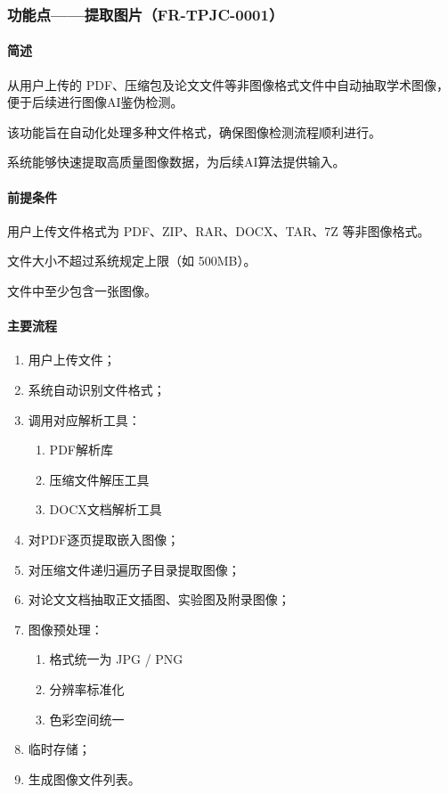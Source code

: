 {\color{black}
\subsubsection{功能点——提取图片（FR-TPJC-0001）}

\paragraph*{简述}

从用户上传的 PDF、压缩包及论文文件等非图像格式文件中自动抽取学术图像，便于后续进行图像AI鉴伪检测。

该功能旨在自动化处理多种文件格式，确保图像检测流程顺利进行。

系统能够快速提取高质量图像数据，为后续AI算法提供输入。

\paragraph*{前提条件}

用户上传文件格式为 PDF、ZIP、RAR、DOCX、TAR、7Z 等非图像格式。

文件大小不超过系统规定上限（如 500MB）。

文件中至少包含一张图像。

\paragraph*{主要流程}

\begin{enumerate}
    \item 用户上传文件；
    \item 系统自动识别文件格式；
    \item 调用对应解析工具：
    \begin{enumerate}
        \item PDF解析库
        \item 压缩文件解压工具
        \item DOCX文档解析工具
    \end{enumerate}
    \item 对PDF逐页提取嵌入图像；
    \item 对压缩文件递归遍历子目录提取图像；
    \item 对论文文档抽取正文插图、实验图及附录图像；
    \item 图像预处理：
    \begin{enumerate}
        \item 格式统一为 JPG / PNG
        \item 分辨率标准化
        \item 色彩空间统一
    \end{enumerate}
    \item 临时存储；
    \item 生成图像文件列表。
\end{enumerate}

}
